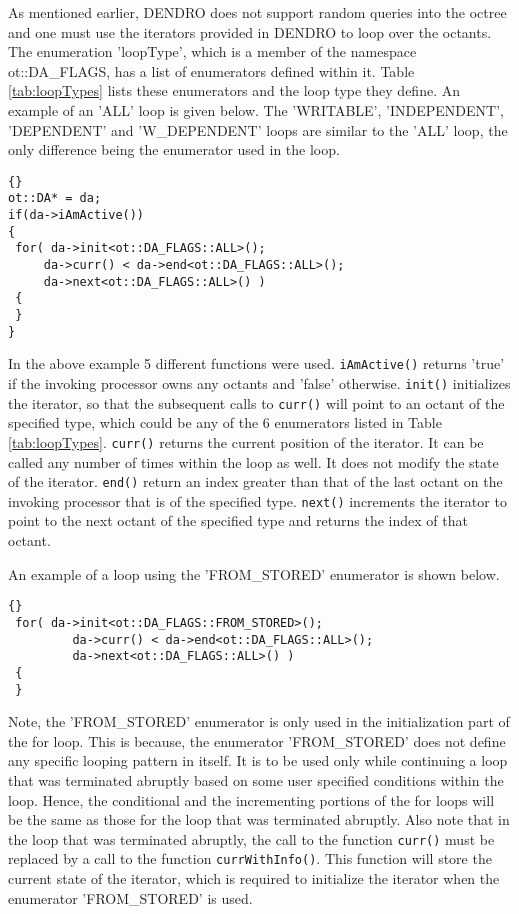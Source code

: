 \documentclass[12pt,reqno,a4paper]{report}
\numberwithin{equation}{section}
\begin{document}
As mentioned earlier, DENDRO does not support random queries into the octree and one must use the iterators provided in DENDRO to loop over the octants. The enumeration 'loopType', which is a member of the namespace ot::DA\_FLAGS, has a list of enumerators defined within it. Table \ref{tab:loopTypes} lists these enumerators and the loop type they define. 
An example of an 'ALL' loop is given below. The 'WRITABLE', 'INDEPENDENT', 'DEPENDENT'
and 'W\_DEPENDENT' loops are similar to the 'ALL' loop, the only difference being the enumerator used in the loop.

\begin{lstlisting}[frame=trbl, fontadjust]{}
ot::DA* = da;
if(da->iAmActive()) 
{
 for( da->init<ot::DA_FLAGS::ALL>(); 
     da->curr() < da->end<ot::DA_FLAGS::ALL>();
     da->next<ot::DA_FLAGS::ALL>() )
 {
 }
}
\end{lstlisting}

In the above example 5 different functions were used. \lstinline[basicstyle=\bfseries]!iAmActive()! returns 'true' if the invoking processor
owns any octants and 'false' otherwise. \lstinline[basicstyle=\bfseries]!init()! initializes the iterator, so that the subsequent calls to 
\lstinline[basicstyle=\bfseries]!curr()! will point to an octant of the specified type, which could be any of the 6 enumerators listed
 in Table \ref{tab:loopTypes}. \lstinline[basicstyle=\bfseries]!curr()! returns the current position of the iterator. It can be called any number of times within the loop as well. It does not modify the state of the iterator. \lstinline[basicstyle=\bfseries]!end()! return an index greater
  than that of the last octant on the invoking processor that is of the specified type. \lstinline[basicstyle=\bfseries]!next()! increments the 
  iterator to point to the next octant of the specified type and returns the index of that octant. 

An example of a loop using the 'FROM\_STORED' enumerator is shown below. 

\begin{lstlisting}[frame=trbl, fontadjust]{}
 for( da->init<ot::DA_FLAGS::FROM_STORED>();
 		 da->curr() < da->end<ot::DA_FLAGS::ALL>();
 		 da->next<ot::DA_FLAGS::ALL>() )
 {
 }
\end{lstlisting}

Note, the 'FROM\_STORED' enumerator is only used in the initialization part of the for loop. This is because, the enumerator 'FROM\_STORED' does not define any specific looping pattern in itself. It is to be used only while continuing a loop that was terminated abruptly based on some user specified conditions within the loop. Hence, the conditional and the incrementing portions of the for loops will be the same as those for the loop that was terminated abruptly. Also note that in the loop that was terminated abruptly, the call to the function \lstinline[basicstyle=\bfseries]!curr()! must be replaced by a call to the function \lstinline[basicstyle=\bfseries]!currWithInfo()!. This function will store the current state of the iterator, which is required to initialize the iterator when the enumerator 'FROM\_STORED' is used.
    
\end{document}
